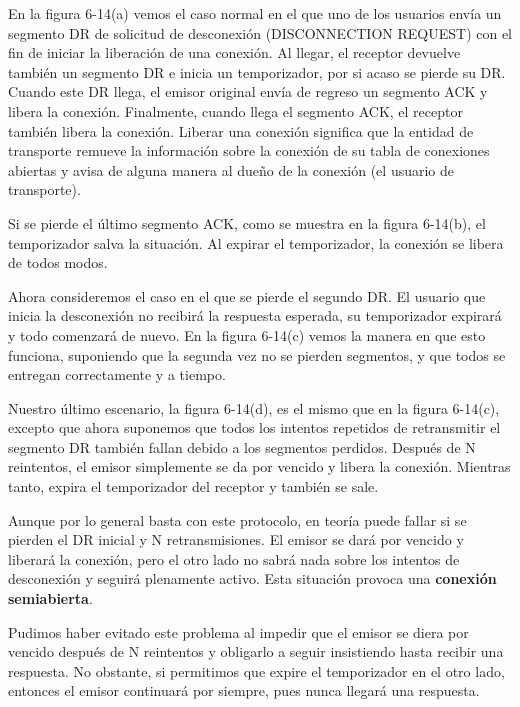 \documentclass[10pt,a4paper]{report}
\begin{document}
	\par En la figura 6-14(a) vemos el caso normal en el que uno de los usuarios envía un segmento DR de solicitud de desconexión (DISCONNECTION REQUEST) con el fin de iniciar la liberación de una conexión. Al llegar, el receptor devuelve también un segmento DR e inicia un temporizador, por si acaso se pierde su DR. Cuando este DR llega, el emisor original envía de regreso un segmento ACK y libera la conexión. Finalmente, cuando llega el segmento ACK, el receptor también libera la conexión. Liberar una conexión significa que la entidad de transporte remueve la información sobre la conexión de su tabla de conexiones abiertas y avisa de alguna manera al dueño de la conexión (el usuario de transporte).
	
	\par Si se pierde el último segmento ACK, como se muestra en la figura 6-14(b), el temporizador salva la situación. Al expirar el temporizador, la conexión se libera de todos modos.

	\par Ahora consideremos el caso en el que se pierde el segundo DR. El usuario que inicia la desconexión no recibirá la respuesta esperada, su temporizador expirará y todo comenzará de nuevo. En la figura 6-14(c) vemos la manera en que esto funciona, suponiendo que la segunda vez no se pierden segmentos, y que todos se entregan correctamente y a tiempo.

	\par Nuestro último escenario, la figura 6-14(d), es el mismo que en la figura 6-14(c), excepto que ahora suponemos que todos los intentos repetidos de retransmitir el segmento DR también fallan debido a los segmentos perdidos. Después de N reintentos, el emisor simplemente se da por vencido y libera la conexión. Mientras tanto, expira el temporizador del receptor y también se sale.
	
	\par Aunque por lo general basta con este protocolo, en teoría puede fallar si se pierden el DR inicial y N retransmisiones. El emisor se dará por vencido y liberará la conexión, pero el otro lado no sabrá nada sobre los intentos de desconexión y seguirá plenamente activo. Esta situación provoca una \textbf{conexión semiabierta}.

	\par Pudimos haber evitado este problema al impedir que el emisor se diera por vencido después de N reintentos y obligarlo a seguir insistiendo hasta recibir una respuesta. No obstante, si permitimos que expire el temporizador en el otro lado, entonces el emisor continuará por siempre, pues nunca llegará una respuesta. 
\end{document}
